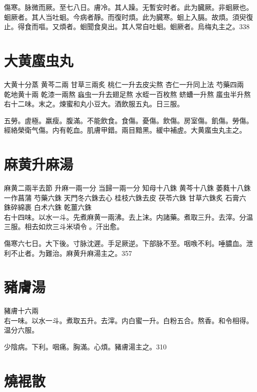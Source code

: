 傷寒。脉微而厥。至七八日。膚冷。其人躁。无暫安时者。此为臓厥。非蛔厥也。蛔厥者。其人当吐蛔。今病者靜。而復时煩。此为臓寒。蛔上入膈。故煩。須臾復止。得食而嘔。又煩者。蛔聞食臭出。其人常自吐蛔。蛔厥者。烏梅丸主之。338

\section{大黄䗪虫丸}

大黄{\scriptsize 十分蒸} 黄芩{\scriptsize 二兩} 甘草{\scriptsize 三兩炙} 桃仁{\scriptsize 一升去皮尖熬} 杏仁{\scriptsize 一升同上法} 芍藥{\scriptsize 四兩} 乾地黄{\scriptsize 十兩} 乾漆{\scriptsize 一兩熬} 蝱虫{\scriptsize 一升去翅足熬} 水蛭{\scriptsize 一百枚熬} 蛴螬{\scriptsize 一升熬} 䗪虫{\scriptsize 半升熬}\\
右十二味。末之。煉蜜和丸小豆大。酒飲服五丸。日三服。

五勞。虗極。羸瘦。腹滿。不能飲食。食傷。憂傷。飲傷。房室傷。飢傷。勞傷。經絡榮衛气傷。内有乾血。肌膚甲錯。兩目黯黑。緩中補虗。大黄䗪虫丸主之。

\section{麻黄升麻湯}

麻黄{\scriptsize 二兩半去節} 升麻{\scriptsize 一兩一分} 当歸{\scriptsize 一兩一分} 知母{\scriptsize 十八銖} 黄芩{\scriptsize 十八銖} 萎蕤{\scriptsize 十八銖一作菖蒲} 芍藥{\scriptsize 六銖} 天門冬{\scriptsize 六銖去心} 桂枝{\scriptsize 六銖去皮} 茯苓{\scriptsize 六銖} 甘草{\scriptsize 六銖炙} 石膏{\scriptsize 六銖碎綿裹} 白术{\scriptsize 六銖} 乾薑{\scriptsize 六銖}\\
右十四味。以水一斗。先煮麻黄一兩沸。去上沫。内諸藥。煮取三升。去滓。分温三服。相去如炊三斗米頃令{\sungii 𥁞}。汗出愈。

傷寒六七日。大下後。{\khaai 寸}脉沈遲。手足厥逆。下部脉不至。咽㗋不利。唾膿血。泄利不止者。为難治。麻黄升麻湯主之。357

\section{豬膚湯}

豬膚{\scriptsize 十六兩}\\
右一味。以水一斗。煮取五升。去滓。内白蜜一升。白粉五合。熬香。和令相得。温分六服。

少陰病。下利。咽痛。胸滿。心煩。豬膚湯主之。310

\section{燒裩散}


